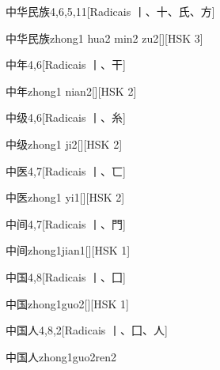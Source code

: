 \begin{entry}{中华民族}{4,6,5,11}[Radicais ⼁、⼗、⽒、⽅]
  \begin{phonetics}{中华民族}{zhong1 hua2 min2 zu2}[][HSK 3]
  \end{phonetics}
\end{entry}

\begin{entry}{中年}{4,6}[Radicais ⼁、⼲]
  \begin{phonetics}{中年}{zhong1 nian2}[][HSK 2]
  \end{phonetics}
\end{entry}

\begin{entry}{中级}{4,6}[Radicais ⼁、⽷]
  \begin{phonetics}{中级}{zhong1 ji2}[][HSK 2]
  \end{phonetics}
\end{entry}

\begin{entry}{中医}{4,7}[Radicais ⼁、⼖]
  \begin{phonetics}{中医}{zhong1 yi1}[][HSK 2]
  \end{phonetics}
\end{entry}

\begin{entry}{中间}{4,7}[Radicais ⼁、⾨]
  \begin{phonetics}{中间}{zhong1jian1}[][HSK 1]
  \end{phonetics}
\end{entry}

\begin{entry}{中国}{4,8}[Radicais ⼁、⼞]
  \begin{phonetics}{中国}{zhong1guo2}[][HSK 1]
  \end{phonetics}
\end{entry}

\begin{entry}{中国人}{4,8,2}[Radicais ⼁、⼞、⼈]
  \begin{phonetics}{中国人}{zhong1guo2ren2}
  \end{phonetics}
\end{entry}

